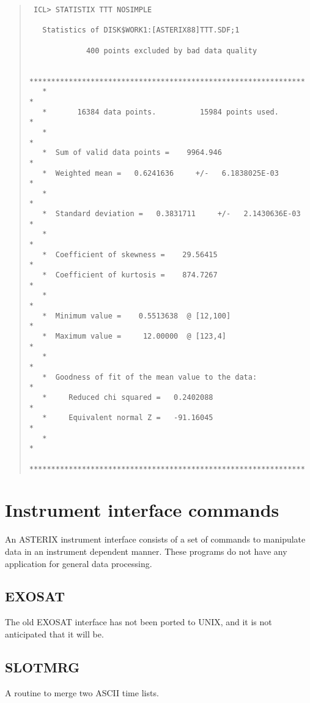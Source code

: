 \documentclass{book}
\renewcommand{\_}{{\tt\char'137}}     %
\begin{document}
\begin{quote}\begin{verbatim}
 ICL> STATISTIX TTT NOSIMPLE
 
   Statistics of DISK$WORK1:[ASTERIX88]TTT.SDF;1
 
             400 points excluded by bad data quality
 
   ***************************************************************
   *                                                             *
   *       16384 data points.          15984 points used.        *
   *                                                             *
   *  Sum of valid data points =    9964.946                     *
   *  Weighted mean =   0.6241636     +/-   6.1838025E-03        *
   *                                                             *
   *  Standard deviation =   0.3831711     +/-   2.1430636E-03   *
   *                                                             *
   *  Coefficient of skewness =    29.56415                      *
   *  Coefficient of kurtosis =    874.7267                      *
   *                                                             *
   *  Minimum value =    0.5513638  @ [12,100]                   *
   *  Maximum value =     12.00000  @ [123,4]                    *
   *                                                             *
   *  Goodness of fit of the mean value to the data:             *
   *     Reduced chi squared =   0.2402088                       *
   *     Equivalent normal Z =   -91.16045                       *
   *                                                             *
   ***************************************************************
\end{verbatim}\end{quote}
\chapter{Instrument interface commands}
An ASTERIX instrument interface consists of a set of commands to
manipulate data in an instrument dependent manner. These programs
do not have any application for general data processing.
 
\section{EXOSAT}
The old EXOSAT interface has not been ported to UNIX, and it is not
anticipated that it will be.
 
\section{SLOTMRG}
A routine to merge two ASCII time lists.
 
\end{document}
